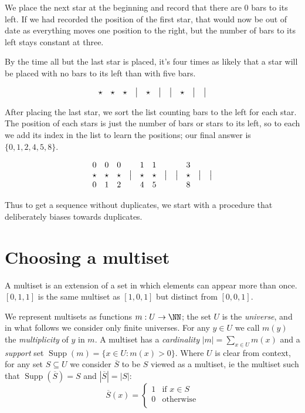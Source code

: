 \documentclass[letterpaper,luatex,11pt]{article}
\DeclareMathOperator{\Supp}{Supp}
\begin{document}
We place the next star at the beginning and record that there are 0 bars to its left. If we had
recorded the position of the first star, that would now be out of date as everything moves one
position to the right, but the number of bars to its left stays constant at three.

By the time all but the last star is placed, it's four times as likely that a star will be placed
with no bars to its left than with five bars.

\begin{displaymath}
\begin{array}{ c c c c c c c c c c }
    \star & \star & \star & \big| & \star & \big| & \big| & \star & \big| & \big| \\
\end{array}
\end{displaymath}

After placing the last star, we sort the list counting bars to the left for each star. The
position of each stars is just the number of bars or stars to its left, so to each we add its index
in the list to learn the positions; our final answer is $\{0, 1, 2, 4, 5, 8\}$.

\begin{displaymath}
\begin{array}{ c c c c c c c c c c c }
    0 & 0 & 0 & & 1 & 1 & & & 3 & & \\
    \star & \star & \star & \big| & \star & \star & \big| & \big| & \star & \big| & \big| \\
    0 & 1 & 2 & & 4 & 5 & & & 8 & & \\
\end{array}
\end{displaymath}

Thus to get a sequence without duplicates, we start with a procedure that deliberately
biases towards duplicates.

\section{Choosing a multiset}

A multiset is an extension of a set in which elements can appear more than once.
$[0, 1, 1]$ is the same multiset as $[1, 0, 1]$ but distinct from $[0, 0, 1]$.

We represent multisets as functions $m: U \rightarrow \NN$; the set $U$ is the \emph{universe},
and in what follows we consider only finite universes. For any $y \in U$ we call
$m(y)$ the \emph{multiplicity} of $y$ in $m$.
A multiset has a \emph{cardinality} $|m| = \sum_{x \in U} m(x)$
and a \emph{support} set $\Supp(m) = \{x \in U: m(x) > 0\}$.
Where $U$ is clear from context, for any set $S \subseteq U$ we consider
$\overline{S}$ to be $S$ viewed as a multiset, ie the multiset
such that $\Supp(\overline{S}) = S$ and $|\overline{S}| = |S|$:
\begin{displaymath}
    \overline{S}(x) =
    \begin{cases}
        1 & \text{if $x \in S$} \\
        0 & \text{otherwise} \\
    \end{cases}
\end{displaymath}
\end{document}
